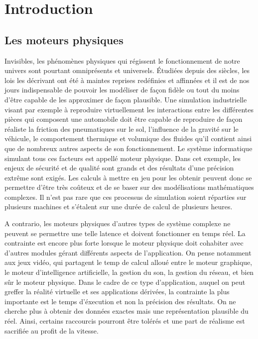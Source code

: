 \section{Introduction}

\subsection{Les moteurs physiques}

Invisibles, les phénomènes physiques qui régissent le fonctionnement de notre univers sont pourtant omniprésents et universels. Étudiées depuis des siècles, les lois les décrivant ont été à maintes reprises redéfinies et affinnées et il est de nos jours indispensable de pouvoir les modéliser de façon fidèle ou tout du moins d'être capable de les approximer de façon plausible. 
Une simulation industrielle visant par exemple à reproduire virtuellement les interactions entre les différentes pièces qui composent une automobile doit être capable de reproduire de façon réaliste la friction des pneumatiques sur le sol, l'influence de la gravité sur le véhicule, le comportement thermique et volumique des fluides qu'il contient ainsi que de nombreux autres aspects de son fonctionnement. Le système informatique simulant tous ces facteurs est appellé moteur physique. Dans cet exemple, les enjeux de sécurité et de qualité sont grands et des résultats d'une précision extrême sont exigés. Les calculs à mettre en jeu pour les obtenir peuvent donc se permettre d'être très coûteux et de se baser sur des modélisations mathématiques complexes. Il n'est pas rare que ces processus de simulation soient réparties sur plusieurs machines et s'étalent sur une durée de calcul de plusieurs heures.

A contrario, les moteurs physiques d'autres types de système complexe ne peuvent se permettre une telle latence et doivent fonctionner en temps réel. La contrainte est encore plus forte lorsque le moteur physique doit cohabiter avec d'autres modules gérant différents aspects de l'application. On pense notamment aux jeux vidéo, qui partagent le temp de calcul alloué entre le moteur graphique, le moteur d'intelligence artificielle, la gestion du son, la gestion du réseau, et bien sûr le moteur physique. Dans le cadre de ce type d'application, auquel on peut greffer la réalité virtuelle et ses applications dérivées, la contrainte la plus importante est le temps d'éxecution et non la précision des résultats. On ne cherche plus à obtenir des données exactes mais une représentation plausible du réel. Ainsi, certains raccourcis pourront être tolérés et une part de réalisme est sacrifiée au profit de la vitesse.


